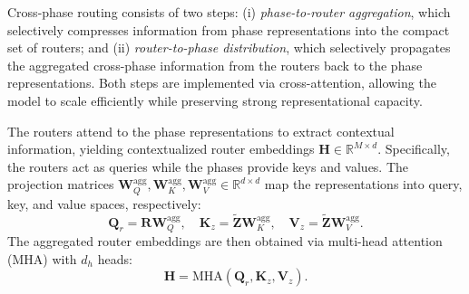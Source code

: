 Cross-phase routing consists of two steps:
(i) \emph{phase-to-router aggregation}, which selectively compresses information from phase representations into the compact set of routers; and (ii) \emph{router-to-phase distribution}, which selectively propagates the aggregated cross-phase information from the routers back to the phase representations. Both steps are implemented via cross-attention, allowing the model to scale efficiently while preserving strong representational capacity.


The routers attend to the phase representations to extract contextual information, yielding contextualized router embeddings 
$\mathbf{H}\in\mathbb{R}^{M\times d}$.  
Specifically, the routers act as queries while the phases provide keys and values. The projection matrices 
$\mathbf{W}_Q^{\text{agg}},\mathbf{W}_K^{\text{agg}},\mathbf{W}_V^{\text{agg}}\in\mathbb{R}^{d\times d}$ 
map the representations into query, key, and value spaces, respectively:  
\begin{equation}
\mathbf{Q}_r=\mathbf{R}\mathbf{W}_Q^{\text{agg}},\quad
\mathbf{K}_z=\tilde{\mathbf{Z}}\mathbf{W}_K^{\text{agg}},\quad
\mathbf{V}_z=\tilde{\mathbf{Z}}\mathbf{W}_V^{\text{agg}}.
\end{equation}
The aggregated router embeddings are then obtained via multi-head attention (MHA) with $d_h$ heads:  
\begin{equation}
\mathbf{H}=\mathrm{MHA}\!\left(\mathbf{Q}_r,\mathbf{K}_z,\mathbf{V}_z\right).
\end{equation}

